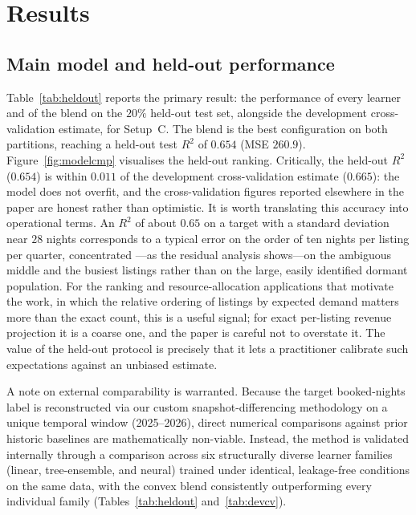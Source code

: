 \documentclass[review,12pt]{elsarticle}
\begin{document}
\section{Results}
\label{sec:results}

\subsection{Main model and held-out performance}
Table~\ref{tab:heldout} reports the primary result: the performance of every
learner and of the blend on the $20\%$ held-out test set, alongside the
development cross-validation estimate, for Setup~C. The blend is the best
configuration on both partitions, reaching a held-out test $R^2$ of $0.654$
(MSE $260.9$). Figure~\ref{fig:modelcmp} visualises the held-out ranking.
Critically, the held-out $R^2$ ($0.654$) is within $0.011$ of the development
cross-validation estimate ($0.665$): the model does not overfit, and the
cross-validation figures reported elsewhere in the paper are honest rather than
optimistic. It is worth translating this accuracy into operational terms. An $R^2$
of about $0.65$ on a target with a standard deviation near $28$ nights corresponds
to a typical error on the order of ten nights per listing per quarter, concentrated
---as the residual analysis shows---on the ambiguous middle and the busiest
listings rather than on the large, easily identified dormant population. For the
ranking and resource-allocation applications that motivate the work, in which the
relative ordering of listings by expected demand matters more than the exact count,
this is a useful signal; for exact per-listing revenue projection it is a coarse
one, and the paper is careful not to overstate it. The value of the held-out
protocol is precisely that it lets a practitioner calibrate such expectations
against an unbiased estimate.

A note on external comparability is warranted. Because the target booked-nights
label is reconstructed via our custom snapshot-differencing methodology on a
unique temporal window (2025--2026), direct numerical comparisons against prior
historic baselines are mathematically non-viable. Instead, the method is validated
internally through a comparison across six structurally diverse learner families
(linear, tree-ensemble, and neural) trained under identical, leakage-free
conditions on the same data, with the convex blend consistently outperforming
every individual family (Tables~\ref{tab:heldout} and~\ref{tab:devcv}).
\end{document}

